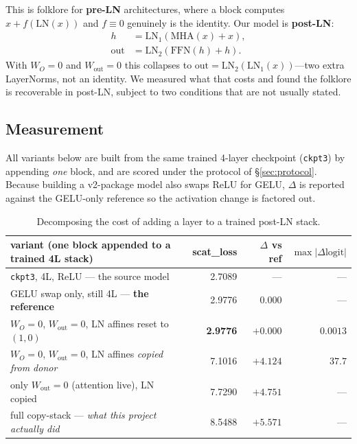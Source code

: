 \documentclass[11pt,a4paper]{article}
\newcommand{\WO}{\ensuremath{W_O}}
\begin{document}
This is folklore for \textbf{pre-LN} architectures, where a block computes $x + f(\mathrm{LN}(x))$
and $f \equiv 0$ genuinely is the identity. Our model is \textbf{post-LN}:
\begin{align}
h   &= \mathrm{LN}_1\!\left(\mathrm{MHA}(x) + x\right), \\
\text{out} &= \mathrm{LN}_2\!\left(\mathrm{FFN}(h) + h\right).
\end{align}
With $\WO = 0$ and $W_\text{out} = 0$ this collapses to
$\text{out} = \mathrm{LN}_2(\mathrm{LN}_1(x))$---two extra LayerNorms, not an identity. We
measured what that costs and found the folklore is recoverable in post-LN, subject to two
conditions that are not usually stated.

\subsection{Measurement}

All variants below are built from the same trained 4-layer checkpoint (\texttt{ckpt3}) by
appending \emph{one} block, and are scored under the protocol of \S\ref{sec:protocol}. Because
building a v2-package model also swaps ReLU for GELU, $\Delta$ is reported against the
GELU-only reference so the activation change is factored out.

\begin{table}[H]
\centering\small
\begin{tabular}{lrrr}
\toprule
variant (one block appended to a trained 4L stack) & scat\_loss & $\Delta$ vs ref & $\max|\Delta\text{logit}|$ \\
\midrule
\texttt{ckpt3}, 4L, ReLU --- the source model                       & 2.7089 & ---      & --- \\
GELU swap only, still 4L --- \textbf{the reference}                 & 2.9776 & $0.000$  & --- \\
$\WO{=}0$, $W_\text{out}{=}0$, LN affines reset to $(1,0)$          & \textbf{2.9776} & $\mathbf{+0.000}$ & $\mathbf{0.0013}$ \\
$\WO{=}0$, $W_\text{out}{=}0$, LN affines \emph{copied from donor}  & 7.1016 & $+4.124$ & $37.7$ \\
only $W_\text{out}{=}0$ (attention live), LN copied                 & 7.7290 & $+4.751$ & --- \\
full copy-stack --- \emph{what this project actually did}           & 8.5488 & $+5.571$ & --- \\
\bottomrule
\end{tabular}
\caption{Decomposing the cost of adding a layer to a trained post-LN stack.}
\label{tab:graft}
\end{table}
\end{document}
